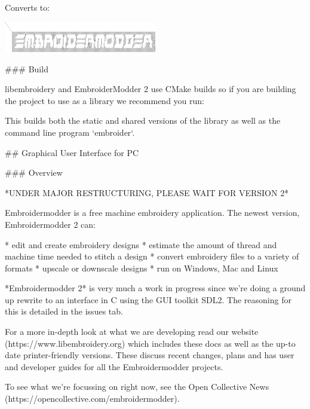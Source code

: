 Converts to:

\includegraphics[width=0.5\textwidth]{images/examples/crossstitch_logo.png}

### Build

libembroidery and EmbroiderModder 2 use CMake builds
so if you are building the project to use as a library we recommend
you run:

%

This builds both the static and shared versions of the library as well
as the command line program `embroider`.

\citep{packard1992pcl}
\citep{linuxcncsrc}
\citep{linuxcnc}
\citep{adobe1990postscript}
\citep{postscript1999postscript}
\citep{eduTechDST}
\citep{cups}
\citep{millOperatorsManual}
\citep{oberg1914machinery}
\citep{dxf_reference}
\citep{embroidermodder_source_code}
\citep{libembroidery_source_code}
\citep{acatina}
\citep{kde_tajima}
\citep{wotsit_archive}
\citep{wotsit_siterip}
\citep{fineemb_dst}
\citep{edutechwiki_dst}

## Graphical User Interface for PC

\label{GUI}

### Overview

*UNDER MAJOR RESTRUCTURING, PLEASE WAIT FOR VERSION 2*

Embroidermodder is a free machine embroidery application.
The newest version, Embroidermodder 2 can:

* edit and create embroidery designs
* estimate the amount of thread and machine time needed to stitch a design
* convert embroidery files to a variety of formats
* upscale or downscale designs
* run on Windows, Mac and Linux

*Embroidermodder 2* is very much a work in progress since we're doing a ground
up rewrite to an interface in C using the GUI toolkit SDL2.
The reasoning for this is detailed in the issues tab.

For a more in-depth look at what we are developing read our
website (https://www.libembroidery.org) which includes these docs as well
as the up-to date printer-friendly versions. These discuss recent changes,
plans and has user and developer guides for all the Embroidermodder projects.

To see what we're focussing on right now, see the Open Collective
News (https://opencollective.com/embroidermodder).

